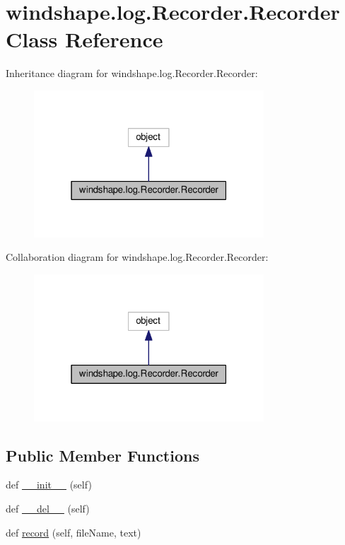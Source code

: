 \hypertarget{classwindshape_1_1log_1_1_recorder_1_1_recorder}{}\section{windshape.\+log.\+Recorder.\+Recorder Class Reference}
\label{classwindshape_1_1log_1_1_recorder_1_1_recorder}


Inheritance diagram for windshape.\+log.\+Recorder.\+Recorder\+:\nopagebreak
\begin{figure}[H]
\begin{center}
\leavevmode
\includegraphics[width=244pt]{classwindshape_1_1log_1_1_recorder_1_1_recorder__inherit__graph}
\end{center}
\end{figure}


Collaboration diagram for windshape.\+log.\+Recorder.\+Recorder\+:\nopagebreak
\begin{figure}[H]
\begin{center}
\leavevmode
\includegraphics[width=244pt]{classwindshape_1_1log_1_1_recorder_1_1_recorder__coll__graph}
\end{center}
\end{figure}
\subsection*{Public Member Functions}
\begin{DoxyCompactItemize}
\item 
def \mbox{\hyperlink{classwindshape_1_1log_1_1_recorder_1_1_recorder_ad1009efa21f00b91429e6516734d5805}{\+\_\+\+\_\+init\+\_\+\+\_\+}} (self)
\item 
def \mbox{\hyperlink{classwindshape_1_1log_1_1_recorder_1_1_recorder_a9bcac5a5ed2167a1b2b10414e7557f8f}{\+\_\+\+\_\+del\+\_\+\+\_\+}} (self)
\item 
def \mbox{\hyperlink{classwindshape_1_1log_1_1_recorder_1_1_recorder_a84bfc08734cfcbe14b0cb1daa5a46690}{record}} (self, file\+Name, text)
\end{DoxyCompactItemize}


